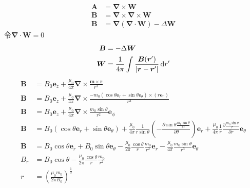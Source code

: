 \begin{align*}
    \boldsymbol{A}&=\boldsymbol{\nabla}\times\boldsymbol{W}\\
    \boldsymbol{B}&=\boldsymbol{\nabla}\times\boldsymbol{\nabla}\times\boldsymbol{W}\\
    \boldsymbol{B}&=\boldsymbol{\nabla}(\boldsymbol{\nabla}\cdot\boldsymbol{W})-\Delta \boldsymbol{W}
\end{align*}
令$\boldsymbol{\nabla}\cdot\boldsymbol{W}=0$
\begin{align*}
    \boldsymbol{B}&=-\Delta \boldsymbol{W}\\
    \boldsymbol{W}&=
\frac{1}{4\pi}
\int
\frac{\boldsymbol{B}(\boldsymbol{r}')}{|\boldsymbol{r}-\boldsymbol{r}'|}
\dif r'
\end{align*}
\begin{align*}
    \boldsymbol{B}&=B_0\boldsymbol{e}_z+\frac{\mu_0}{4\pi}\boldsymbol{\nabla}\times\frac{\boldsymbol{m}\times\boldsymbol{r}}{r^3}\\
    \boldsymbol{B}&=B_0\boldsymbol{e}_z+\frac{\mu_0}{4\pi}\boldsymbol{\nabla}\times\frac{-m_0(\cos\theta\boldsymbol{e}_r+\sin\theta\boldsymbol{e}_\theta)\times(r\boldsymbol{e}_r)}{r^3}\\
    \boldsymbol{B}&=B_0\boldsymbol{e}_z+\frac{\mu_0}{4\pi}\boldsymbol{\nabla}\times\frac{m_0\sin\theta }{r^2}\boldsymbol{e}_\phi\\
    \boldsymbol{B}&=B_0(\cos\theta\boldsymbol{e}_r+\sin\theta\boldsymbol{e}_\theta)+\frac{\mu_0}{4\pi}
    \frac{1}{r\sin\theta}\left(
    -\frac{\partial\sin\theta  \frac{m_0\sin\theta }{r^2}}{\partial \theta}\right)\boldsymbol{e}_r
    +\frac{\mu_0}{4\pi}\frac{1}{r}\frac{\partial \frac{m_0\sin\theta }{r}}{\partial r}\boldsymbol{e}_\theta\\
    \boldsymbol{B}&=B_0\cos\theta\boldsymbol{e}_r+B_0\sin\theta\boldsymbol{e}_\theta-\frac{\mu_0}{2\pi}
    \frac{\cos\theta}{r}\frac{m_0 }{r^2}\boldsymbol{e}_r
    -\frac{\mu_0}{4\pi}\frac{m_0\sin\theta }{r^3}\boldsymbol{e}_\theta\\
    B_r&=B_0\cos\theta-\frac{\mu_0}{2\pi}
    \frac{\cos\theta}{r}\frac{m_0 }{r^2}\\
    r&=\left(\frac{\mu_0m_0}{2\pi B_0}\right)^\frac{1}{3}
\end{align*}
